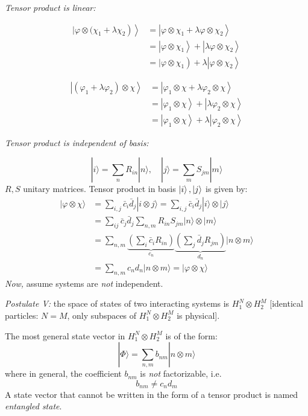 \documentclass[12pt]{article}
\newcommand{\be}{\begin{equation}}
\newcommand{\ee}{\end{equation}}
\begin{document}
\emph{Tensor product is linear:}

\be
\begin{aligned}
\left.\left.|\varphi \otimes( \chi_{1}+\lambda \chi_{2}\right)\right\rangle &=\left|\varphi \otimes \chi_{1}+\lambda \varphi \otimes \chi_{2}\right\rangle \\ &=\left|\varphi \otimes \chi_{1}\right\rangle+\left|\lambda \varphi \otimes \chi_{2}\right\rangle \\ &\left.=| \varphi \otimes \chi_{1}\right)+\lambda\left|\varphi \otimes \chi_{2}\right\rangle 
\end{aligned}
\ee

\be
\begin{aligned}
\left|\left(\varphi_{1}+\lambda \varphi_{2}\right) \otimes \chi\right\rangle &=\left|\varphi_{1} \otimes \chi+\lambda \varphi_{2} \otimes \chi\right\rangle \\ &=\left|\varphi_{1} \otimes \chi\right\rangle+\left|\lambda \varphi_{2} \otimes \chi\right\rangle \\ &=\left|\varphi_{1} \otimes \chi\right\rangle+\lambda\left|\varphi_{2} \otimes \chi\right\rangle
\end{aligned}
\ee

\emph{Tensor product is independent of basis:}

\be
|i\rangle=\sum_{n} R_{i n}|n\rangle, \quad|j\rangle=\sum_{m} S_{j m}|m\rangle
\ee
$R,S$ unitary matrices. Tensor product in basis
$\ket{i},\ket{j}$ is given by:
\be
\begin{aligned}
|\varphi \otimes \chi\rangle 
&=\sum_{i, j} \bar{c}_{i} \bar{d}_{j}|i \otimes j\rangle=\sum_{i, j} \bar{c}_{i} \bar{d}_{j}|i\rangle \otimes|j\rangle\\
&=\sum_{i j} \bar{c}_{j} \bar{d}_{j} \sum_{n, m} R_{i n} S_{j m} |n\rangle \otimes|m\rangle\\
&=\sum_{n, m}
\underbrace{\left(\sum_{i} \bar{c}_{i} R_{i n}\right)}%
_{c_n}
\underbrace{\left(\sum_{j} \bar{d}_{j} R_{j m}\right)}%
_{d_n}
|n \otimes m\rangle\\
&=\sum_{n, m} c_{n} d_{n}|n \otimes m\rangle=|\varphi \otimes \chi\rangle
\end{aligned}
\ee
\emph{Now,} assume systems are \emph{not} independent.

\emph{Postulate V:} the space of states of two interacting systems
is $H_1^N \otimes H_2^M$ [identical particles: $N=M$,
only subspaces of $H_1^N \otimes H_2^M$ is physical].

The most general state vector in $H_{1}^{N} \otimes H_{2}^{M}$ is of the form:
\be
|\Phi\rangle=\sum_{n, m} b_{n m}|n \otimes m\rangle
\ee
where in general, the coefficient $b_{n m}$ is \emph{not} factorizable, i.e.
\be
b_{n m} \neq c_{n} d_{m}
\ee
A state vector that cannot be written in the form
of a tensor product is named \emph{entangled state}.
\end{document}
